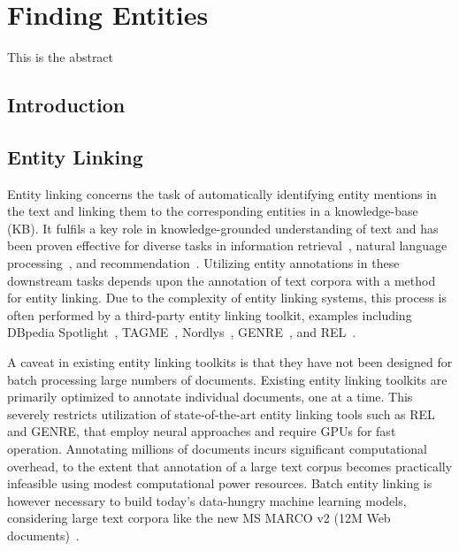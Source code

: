\chapter{Finding Entities}
\label{a-graph-of-entities}

\begin{Abstract}
	\begin{changemargin}{1cm}{1cm}
		This is the abstract  
	\end{changemargin}
\end{Abstract}

\section{Introduction}

\section{Entity Linking}
Entity linking concerns the task of automatically identifying entity mentions in the text and linking them to the corresponding entities in a knowledge-base (KB). It fulfils a key role in knowledge-grounded understanding of text and has been proven effective for diverse tasks in information retrieval~\cite{Gerritse:2022:EMBERT, Gerritse:2020:GEER, doc-ranking-entity, el-ranking-hasibi, el-balog, query-recommendation-entity, chatterjee2022bert}, natural language processing~\cite{lin-etal-2012-entity, watson}, and recommendation~\cite{yang-etal-2018-collective}.
Utilizing entity annotations in these downstream tasks depends upon the annotation of text corpora with a method for entity linking. Due to the complexity of entity linking systems, this process is often performed by a third-party entity linking toolkit, examples including DBpedia Spotlight~\cite{dbpedia-spotlight}, TAGME~\cite{tagme}, Nordlys~\cite{nordlys}, GENRE~\cite{genre}, and REL~\cite{REL}. 

A caveat in existing entity linking toolkits is that they have not been designed for batch processing large numbers of documents. Existing entity linking toolkits are primarily optimized to annotate individual documents, one at a time. This severely restricts utilization of state-of-the-art entity linking tools such as REL and GENRE, that employ neural approaches and require GPUs for fast operation. Annotating millions of documents incurs significant computational overhead, to the extent that annotation of a large text corpus becomes practically infeasible using modest computational power resources. Batch entity linking is however necessary to build today's data-hungry machine learning models, considering large text corpora like the new MS MARCO v2 (12M Web documents)~\cite{msmarco}.

